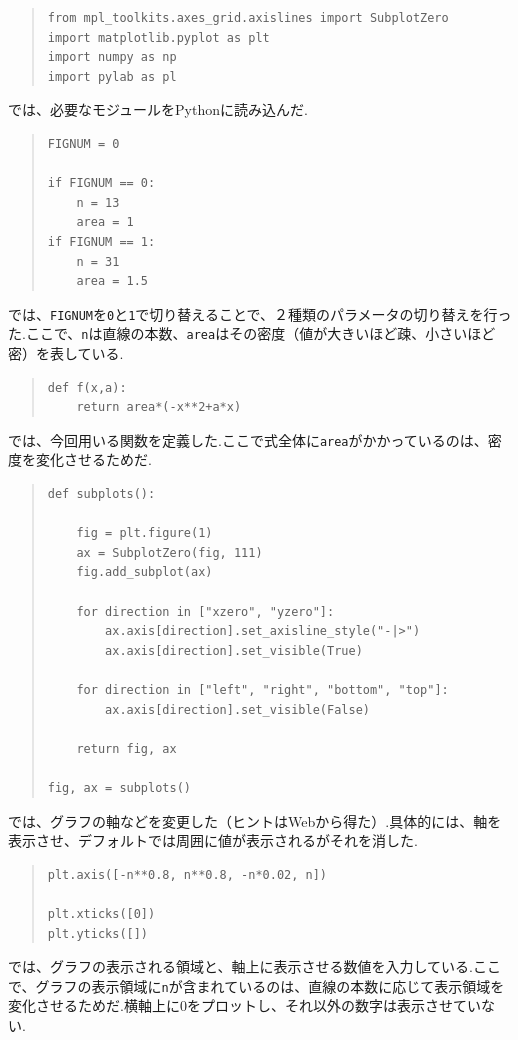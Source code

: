 \documentclass[11pt,a4j,fleqn]{jarticle}
\begin{document}
\begin{quote}
\begin{verbatim}
from mpl_toolkits.axes_grid.axislines import SubplotZero
import matplotlib.pyplot as plt
import numpy as np
import pylab as pl
\end{verbatim}
\end{quote}
では、必要なモジュールをPythonに読み込んだ.
\begin{quote}
\begin{verbatim}
FIGNUM = 0

if FIGNUM == 0:
    n = 13
    area = 1
if FIGNUM == 1:
    n = 31
    area = 1.5
\end{verbatim}
\end{quote}
では、\verb|FIGNUM|を\verb|0|と\verb|1|で切り替えることで、２種類のパラメータの切り替えを行った.ここで、\verb|n|は直線の本数、\verb|area|はその密度（値が大きいほど疎、小さいほど密）を表している.

\begin{quote}
\begin{verbatim}
def f(x,a):  
    return area*(-x**2+a*x)
\end{verbatim}
\end{quote}
では、今回用いる関数を定義した.ここで式全体に\verb|area|がかかっているのは、密度を変化させるためだ.

\begin{quote}
\begin{verbatim}
def subplots():
    
    fig = plt.figure(1)
    ax = SubplotZero(fig, 111)
    fig.add_subplot(ax)

    for direction in ["xzero", "yzero"]:
        ax.axis[direction].set_axisline_style("-|>")
        ax.axis[direction].set_visible(True)

    for direction in ["left", "right", "bottom", "top"]: 
        ax.axis[direction].set_visible(False)

    return fig, ax

fig, ax = subplots()
\end{verbatim}
\end{quote}
では、グラフの軸などを変更した（ヒントはWeb\cite{web}から得た）.具体的には、軸を表示させ、デフォルトでは周囲に値が表示されるがそれを消した.

\begin{quote}
\begin{verbatim}
plt.axis([-n**0.8, n**0.8, -n*0.02, n])

plt.xticks([0])
plt.yticks([])
\end{verbatim}
\end{quote}
では、グラフの表示される領域と、軸上に表示させる数値を入力している.ここで、グラフの表示領域に\verb|n|が含まれているのは、直線の本数に応じて表示領域を変化させるためだ.横軸上に0をプロットし、それ以外の数字は表示させていない.
\end{document}
